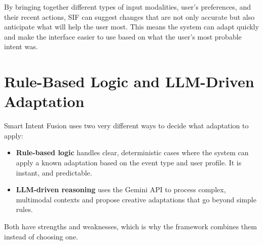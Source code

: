 \documentclass[openany]{book}
\begin{document}
By bringing together different types of input modalities, user’s preferences, and their recent actions, SIF can suggest changes that are not only accurate but also anticipate what will help the user most. This means the system can adapt quickly and make the interface easier to use based on what the user's most probable intent was.

\section{Rule-Based Logic and LLM-Driven Adaptation}
Smart Intent Fusion uses two very different ways to decide what adaptation to apply:
\begin{itemize}
    \item \textbf{Rule-based logic} handles clear, deterministic cases where the system can apply a known adaptation based on the event type and user profile. It is instant, and predictable.
    \item \textbf{LLM-driven reasoning} uses the Gemini API to process complex, multimodal contexts and propose creative adaptations that go beyond simple rules.
\end{itemize}
Both have strengths and weaknesses, which is why the framework combines them instead of choosing one.
\end{document}
